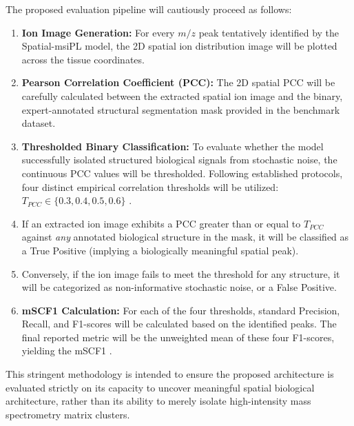 \documentclass[
12pt, %
oneside, %
english, %
onehalfspacing, %
nolistspacing, %
headsepline, %
]{MastersDoctoralThesis} %
\begin{document}
The proposed evaluation pipeline will cautiously proceed as follows:
\begin{enumerate}
    \item \textbf{Ion Image Generation:} For every $m/z$ peak tentatively identified by the Spatial-msiPL model, the 2D spatial ion distribution image will be plotted across the tissue coordinates.
    \item \textbf{Pearson Correlation Coefficient (PCC):} The 2D spatial PCC will be carefully calculated between the extracted spatial ion image and the binary, expert-annotated structural segmentation mask provided in the benchmark dataset.
    \item \textbf{Thresholded Binary Classification:} To evaluate whether the model successfully isolated structured biological signals from stochastic noise, the continuous PCC values will be thresholded. Following established protocols, four distinct empirical correlation thresholds will be utilized: $T_{PCC} \in \{0.3, 0.4, 0.5, 0.6\}$ \citep{weigand2026spatial}.
    \item If an extracted ion image exhibits a PCC greater than or equal to $T_{PCC}$ against \textit{any} annotated biological structure in the mask, it will be classified as a True Positive (implying a biologically meaningful spatial peak).
    \item Conversely, if the ion image fails to meet the threshold for any structure, it will be categorized as non-informative stochastic noise, or a False Positive.
    \item \textbf{mSCF1 Calculation:} For each of the four thresholds, standard Precision, Recall, and F1-scores will be calculated based on the identified peaks. The final reported metric will be the unweighted mean of these four F1-scores, yielding the mSCF1 \citep{weigand2026spatial}.
\end{enumerate}

This stringent methodology is intended to ensure the proposed architecture is evaluated strictly on its capacity to uncover meaningful spatial biological architecture, rather than its ability to merely isolate high-intensity mass spectrometry matrix clusters.
\end{document}

